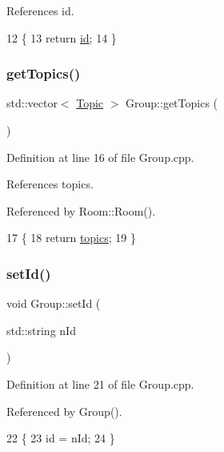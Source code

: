 References id.


\begin{DoxyCode}
12 \{
13     \textcolor{keywordflow}{return} \hyperlink{class_group_ade135fec88f463adb44f780cb476e7d3}{id};
14 \}
\end{DoxyCode}
\mbox{\label{class_group_a160daa5f96a8203bd30340dfc1810af1}} 
\subsubsection{\texorpdfstring{get\+Topics()}{getTopics()}}
{\footnotesize\ttfamily std\+::vector$<$ \hyperlink{class_topic}{Topic} $>$ Group\+::get\+Topics (\begin{DoxyParamCaption}{ }\end{DoxyParamCaption})}



Definition at line 16 of file Group.\+cpp.



References topics.



Referenced by Room\+::\+Room().


\begin{DoxyCode}
17 \{
18     \textcolor{keywordflow}{return} \hyperlink{class_group_a5927c259318d2058c9d1573110718bb5}{topics};
19 \}
\end{DoxyCode}
\mbox{\label{class_group_aba314538b0284ebfdf2e89fcdeef8697}} 
\subsubsection{\texorpdfstring{set\+Id()}{setId()}}
{\footnotesize\ttfamily void Group\+::set\+Id (\begin{DoxyParamCaption}\item[{std\+::string}]{n\+Id }\end{DoxyParamCaption})}



Definition at line 21 of file Group.\+cpp.



Referenced by Group().


\begin{DoxyCode}
22 \{
23     \textcolor{keywordtype}{id} = nId;
24 \}
\end{DoxyCode}
\mbox{\label{class_group_ab37f8ac624dedf6eb84e2603e9c51df2}} 
